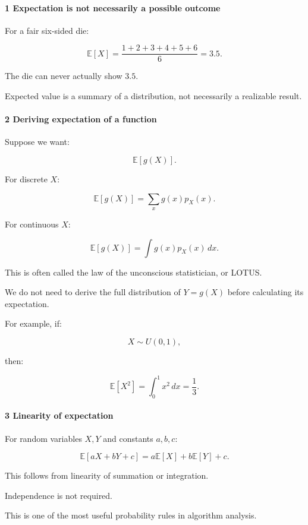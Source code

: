 \paragraph{1 Expectation is not necessarily a possible outcome}\label{expectation-is-not-necessarily-a-possible-outcome}

For a fair six-sided die:

\[
 \mathbb E[X] = \frac{1+2+3+4+5+6}{6} =\boxed{3.5}.
\]

The die can never actually show \(3.5\).

Expected value is a summary of a distribution, not necessarily a realizable result.

\paragraph{2 Deriving expectation of a function}\label{deriving-expectation-of-a-function}

Suppose we want:

\[
 \mathbb E[g(X)].
\]

For discrete \(X\):

\[
 \boxed{ \mathbb E[g(X)] = \sum_xg(x)p_X(x) }.
\]

For continuous \(X\):

\[
 \boxed{ \mathbb E[g(X)] = \int g(x)p_X(x)\,dx }.
\]

This is often called the law of the unconscious statistician, or LOTUS.

We do not need to derive the full distribution of \(Y=g(X)\) before calculating its expectation.

For example, if:

\[
 X\sim U(0,1),
\]

then:

\[
 \mathbb E[X^2] = \int_0^1x^2\,dx =\boxed{\frac13}.
\]

\paragraph{3 Linearity of expectation}\label{linearity-of-expectation}

For random variables \(X,Y\) and constants \(a,b,c\):

\[
 \boxed{ \mathbb E[aX+bY+c] = a\mathbb E[X]+b\mathbb E[Y]+c }.
\]

This follows from linearity of summation or integration.

Independence is not required.

This is one of the most useful probability rules in algorithm analysis.

